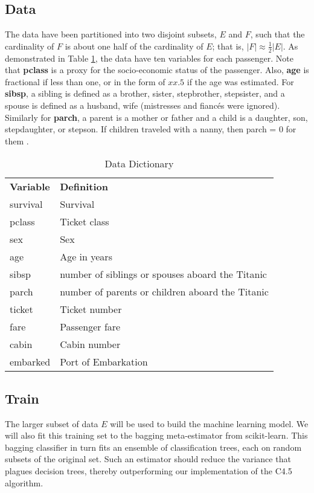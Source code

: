 \documentclass[12pt]{amsproc}
\theoremstyle{definition}
\begin{document}
	\subsection{Data}\label{method:data}
	The data have been partitioned into two disjoint subsets, $E$ and $F$, such that the cardinality of $F$ is about one half of the cardinality of $E$; that is, $|F| \approx \frac{1}{2} |E|$. As demonstrated in Table \ref{table:data dictionary}, the data have ten variables for each passenger. Note that \textbf{pclass} is a proxy for the socio-economic status of the passenger. Also, \textbf{age} is fractional if less than one, or in the form of $xx.5$ if the age was estimated. For \textbf{sibsp}, a sibling is defined as a brother, sister, stepbrother, stepsister, and a spouse is defined as a husband, wife (mistresses and fianc\'{e}s were ignored). Similarly for \textbf{parch}, a parent is a mother or father and a child is a daughter, son, stepdaughter, or stepson. If children traveled with a nanny, then parch = 0 for them \cite{kaggle}.
	 

	\begin{table}[h]
		\centering
		\caption{Data Dictionary}
		\label{table:data dictionary}
		\begin{tabular}{ll}
			\textbf{Variable} & \textbf{Definition} \\
			survival & Survival \\
			pclass & Ticket class \\
			sex & Sex \\
			age & Age in years \\
			sibsp & number of siblings or spouses aboard the Titanic \\
			parch & number of parents or children aboard the Titanic \\
			ticket & Ticket number \\
			fare & Passenger fare \\
			cabin & Cabin number \\
			embarked & Port of Embarkation
		\end{tabular}
	\end{table}
	
	
	\subsection{Train}\label{method:train}
	The larger subset of data $E$ will be used to build the machine learning model. We will also fit this training set to the bagging meta-estimator from scikit-learn. This bagging classifier in turn fits an ensemble of classification trees, each on random subsets of the original set. Such an estimator should reduce the variance that plagues decision trees, thereby outperforming our implementation of the C4.5 algorithm.
	
\end{document}
